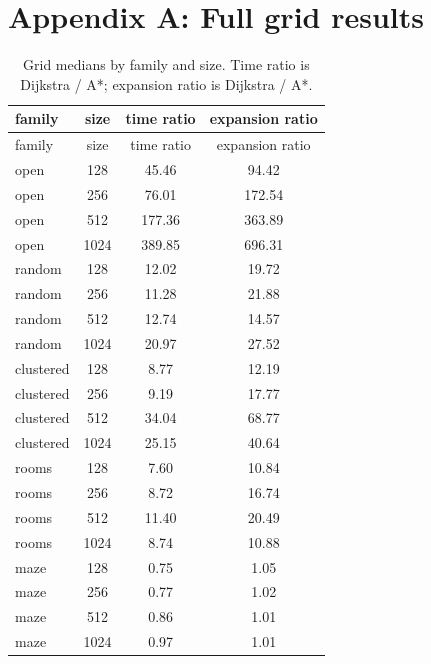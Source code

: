 \clearpage
\onecolumn
\section*{Appendix A: Full grid results}
\begin{longtable}{lccc}
\caption{Grid medians by family and size.  Time ratio is Dijkstra / A*; expansion ratio is Dijkstra / A*.}\label{tab:appendix-grid}\\
\toprule
family & size & time ratio & expansion ratio\\
\midrule
\endfirsthead
\toprule
family & size & time ratio & expansion ratio\\
\midrule
\endhead
open & 128 & 45.46 & 94.42\\
open & 256 & 76.01 & 172.54\\
open & 512 & 177.36 & 363.89\\
open & 1024 & 389.85 & 696.31\\
random & 128 & 12.02 & 19.72\\
random & 256 & 11.28 & 21.88\\
random & 512 & 12.74 & 14.57\\
random & 1024 & 20.97 & 27.52\\
clustered & 128 & 8.77 & 12.19\\
clustered & 256 & 9.19 & 17.77\\
clustered & 512 & 34.04 & 68.77\\
clustered & 1024 & 25.15 & 40.64\\
rooms & 128 & 7.60 & 10.84\\
rooms & 256 & 8.72 & 16.74\\
rooms & 512 & 11.40 & 20.49\\
rooms & 1024 & 8.74 & 10.88\\
maze & 128 & 0.75 & 1.05\\
maze & 256 & 0.77 & 1.02\\
maze & 512 & 0.86 & 1.01\\
maze & 1024 & 0.97 & 1.01\\
\bottomrule
\end{longtable}

